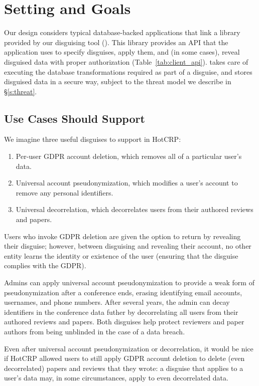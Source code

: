 \section{Setting and Goals}
Our design considers typical database-backed applications that link a library provided by our disguising
tool (\sys).
%
This library provides an API that the application uses to specify disguises, apply them, and (in some
cases), reveal disguised data with proper authorization (Table~\ref{tab:client_api}).
%
\sys takes care of executing the database transformations required as part of a disguise, and stores
disguised data in a secure way, subject to the threat model we describe in \S\ref{s:threat}.

\subsection{Use Cases \sys Should Support}

We imagine three useful disguises to support in HotCRP: 
\begin{enumerate}
    \item Per-user GDPR account deletion, which
removes all of a particular user's data.
        \item Universal account pseudonymization, which modifies a user's
account to remove any personal identifiers.
        \item Universal decorrelation, which decorrelates users from
their authored reviews and papers.
\end{enumerate}

Users who invoke GDPR deletion are given the option to return by revealing their disguise; however,
between disguising and revealing their account, no other entity learns the identity or
existence of the user (ensuring that the disguise complies with the GDPR).

Admins can apply universal account pseudonymization to provide a weak form of pseudonymization after a
conference ends, erasing \eg identifying email accounts, usernames, and phone numbers. 
After several years, the admin can decay identifiers in the conference data futher by decorrelating
all users from their authored reviews and papers. Both disguises help protect reviewers and paper authors
from being unblinded in the case of a data breach.

Even after universal account pseudonymization or decorrelation, it would be nice if HotCRP allowed
users to still apply GDPR account deletion to delete (even decorrelated) papers and reviews that they
wrote: a disguise that applies to a user's data may, in some circumstances, apply to even decorrelated data.


